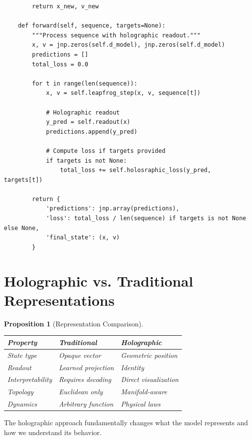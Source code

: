 \documentclass[12pt,letterpaper,twoside]{article}
\newtheorem{prop}{Proposition}[section]
\begin{document}
\begin{verbatim}
        return x_new, v_new
    
    def forward(self, sequence, targets=None):
        """Process sequence with holographic readout."""
        x, v = jnp.zeros(self.d_model), jnp.zeros(self.d_model)
        predictions = []
        total_loss = 0.0
        
        for t in range(len(sequence)):
            x, v = self.leapfrog_step(x, v, sequence[t])
            
            # Holographic readout
            y_pred = self.readout(x)
            predictions.append(y_pred)
            
            # Compute loss if targets provided
            if targets is not None:
                total_loss += self.holosraphic_loss(y_pred, targets[t])
        
        return {
            'predictions': jnp.array(predictions),
            'loss': total_loss / len(sequence) if targets is not None else None,
            'final_state': (x, v)
        }
\end{verbatim}

\section{Holographic vs. Traditional Representations}

\begin{prop}[Representation Comparison]
\begin{center}
\begin{tabular}{p{}p{}p{}}
\toprule
Property & Traditional & Holographic \\ \midrule
State type & Opaque vector & Geometric position \\
Readout & Learned projection & Identity \\
Interpretability & Requires decoding & Direct visualization \\
Topology & Euclidean only & Manifold-aware \\
Dynamics & Arbitrary function & Physical laws \\ \bottomrule
\end{tabular}
\end{center}
\end{prop}

The holographic approach fundamentally changes what the model represents and how we understand its behavior.
\end{document}
